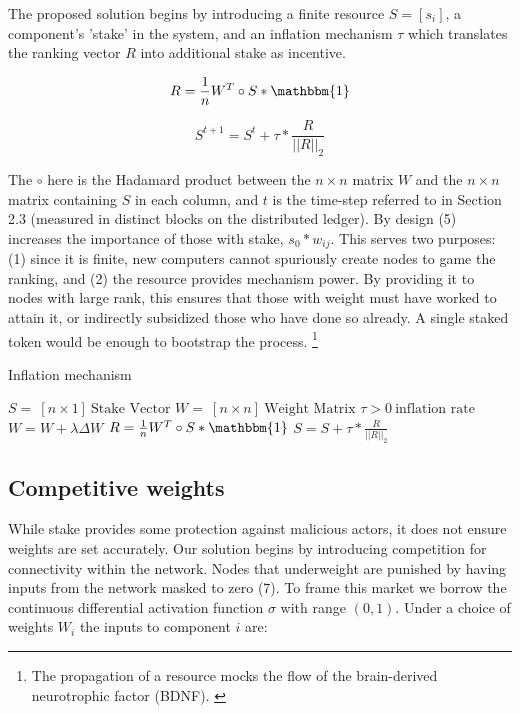 \documentclass{article}
\begin{document}
The proposed solution begins by introducing a finite resource $ S=[s_i]$, a component's 'stake' in the system, and an inflation mechanism $\tau$ which translates the ranking vector $R$ into additional stake as incentive. 
\bigskip

\begin{equation}
R = \frac{1}{n} W^T \circ S * \mathbbm{1}
\end{equation}

\begin{equation}
S^{t+1} = S^t + \tau * \frac{R}{||R||_2} 
\end{equation}

The $\circ$ here is the Hadamard product between the $n \times n$ matrix $W$ and the $n \times n$ matrix containing $S$ in each column, and $t$ is the time-step referred to in Section 2.3 (measured in distinct blocks on the distributed ledger). By design (5) increases the importance of those with stake, $s_0 * w_{ij}$. This serves two purposes: (1) since it is finite, new computers cannot spuriously create nodes to game the ranking, and (2) the resource provides mechanism power. By providing it to nodes with large rank, this ensures that those with weight must have worked to attain it, or indirectly subsidized those who have done so already. A single staked token would be enough to bootstrap the process. \footnote{The propagation of a resource mocks the flow of the brain-derived neurotrophic factor (BDNF). \cite{Bathina1989neurotrophin}} 
\smallskip

\begin{algorithm}
\caption{Inflation mechanism}
\begin{algorithmic} 

\REQUIRE $S = \ [n \times 1] \ \textrm{Stake Vector}$
\REQUIRE $W = \ [n \times n] \ \textrm{Weight Matrix}$
\REQUIRE $\tau > 0 \ \textrm{inflation rate}$
\STATE $W = W + \lambda \Delta W$
\STATE $R = \frac{1}{n} W^T \circ S * \mathbbm{1}$
\STATE $S = S + \tau * \frac{R}{||R||_2}  $
\ENDWHILE
\end{algorithmic}
\end{algorithm}
\smallskip

\subsection{Competitive weights}

While stake provides some protection against malicious actors, it does not ensure weights are set accurately. Our solution begins by introducing competition for connectivity within the network. Nodes that underweight are punished by having inputs from the network masked to zero (7). To frame this market we borrow the continuous differential activation function $\sigma$ with range $(0,1)$. Under a choice of weights $W_i$ the inputs to component $i$ are:
\bigskip
\end{document}
